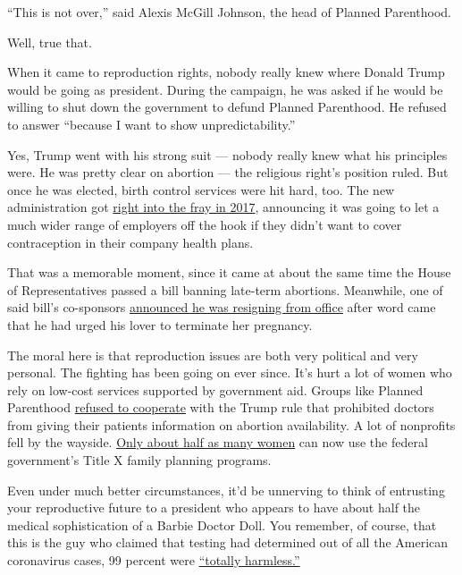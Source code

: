 ``This is not over,'' said Alexis McGill Johnson, the head of Planned
Parenthood.

Well, true that.

When it came to reproduction rights, nobody really knew where Donald
Trump would be going as president. During the campaign, he was asked if
he would be willing to shut down the government to defund Planned
Parenthood. He refused to answer ``because I want to show
unpredictability.''

Yes, Trump went with his strong suit --- nobody really knew what his
principles were. He was pretty clear on abortion --- the religious
right's position ruled. But once he was elected, birth control services
were hit hard, too. The new administration got
\href{https://www.nytimes.com/2017/10/06/us/politics/trump-contraception-birth-control.html}{right
into the fray in 2017}, announcing it was going to let a much wider
range of employers off the hook if they didn't want to cover
contraception in their company health plans.

That was a memorable moment, since it came at about the same time the
House of Representatives passed a bill banning late-term abortions.
Meanwhile, one of said bill's co-sponsors
\href{https://www.nytimes.com/2017/10/05/us/politics/tim-murphy-resigns-abortion-scandal.html}{announced
he was resigning from office} after word came that he had urged his
lover to terminate her pregnancy.

The moral here is that reproduction issues are both very political and
very personal. The fighting has been going on ever since. It's hurt a
lot of women who rely on low-cost services supported by government aid.
Groups like Planned Parenthood
\href{https://www.nytimes.com/2019/08/19/health/planned-parenthood-title-x.html}{refused
to cooperate} with the Trump rule that prohibited doctors from giving
their patients information on abortion availability. A lot of nonprofits
fell by the wayside.
\href{https://www.guttmacher.org/article/2020/02/trump-administrations-domestic-gag-rule-has-slashed-title-x-networks-capacity-half}{Only
about half as many women} can now use the federal government's Title X
family planning programs.

Even under much better circumstances, it'd be unnerving to think of
entrusting your reproductive future to a president who appears to have
about half the medical sophistication of a Barbie Doctor Doll. You
remember, of course, that this is the guy who claimed that testing had
determined out of all the American coronavirus cases, 99 percent were
\href{https://www.washingtonpost.com/politics/2020/07/08/trumps-claim-that-99-percent-covid-9-cases-are-totally-harmless/}{``totally
harmless.''}

